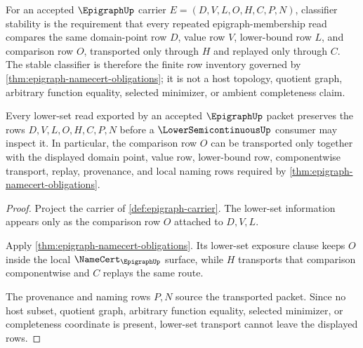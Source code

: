 \begin{definition}
\label{def:epigraph-classifier-stability}
For an accepted $\EpigraphUp$ carrier $E=(D,V,L,O,H,C,P,N)$, classifier stability is the requirement that every repeated epigraph-membership read compares the same domain-point row $D$, value row $V$, lower-bound row $L$, and comparison row $O$, transported only through $H$ and replayed only through $C$. The stable classifier is therefore the finite row inventory governed by \autoref{thm:epigraph-namecert-obligations}; it is not a host topology, quotient graph, arbitrary function equality, selected minimizer, or ambient completeness claim.
\end{definition}

\begin{theorem}
\label{thm:epigraph-lower-set-transport}
Every lower-set read exported by an accepted $\EpigraphUp$ packet preserves the rows $D,V,L,O,H,C,P,N$ before a $\LowerSemicontinuousUp$ consumer may inspect it. In particular, the comparison row $O$ can be transported only together with the displayed domain point, value row, lower-bound row, componentwise transport, replay, provenance, and local naming rows required by \autoref{thm:epigraph-namecert-obligations}.
\end{theorem}
\begin{proof}
Project the carrier of \autoref{def:epigraph-carrier}. The lower-set information appears only as the comparison row $O$ attached to $D,V,L$.

Apply \autoref{thm:epigraph-namecert-obligations}. Its lower-set exposure clause keeps $O$ inside the local $\NameCert_{\EpigraphUp}$ surface, while $H$ transports that comparison componentwise and $C$ replays the same route.

The provenance and naming rows $P,N$ source the transported packet. Since no host subset, quotient graph, arbitrary function equality, selected minimizer, or completeness coordinate is present, lower-set transport cannot leave the displayed rows.
\end{proof}

